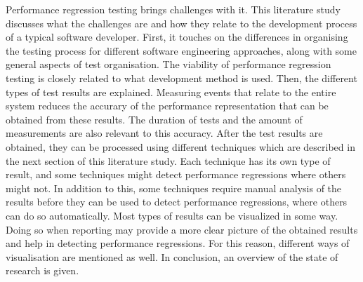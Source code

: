 Performance regression testing brings challenges with it. This literature study discusses what the challenges are and how they relate to the development process of a typical software developer.
First, it touches on the differences in organising the testing process for different software engineering approaches, along with some general aspects of test organisation. The viability of performance regression testing is closely related to what development method is used.
Then, the different types of test results are explained. Measuring events that relate to the entire system reduces the accurary of the performance representation that can be obtained from these results. The duration of tests and the amount of measurements are also relevant to this accuracy.
After the test results are obtained, they can be processed using different techniques which are described in the next section of this literature study. Each technique has its own type of result, and some techniques might detect performance regressions where others might not. In addition to this, some techniques require manual analysis of the results before they can be used to detect performance regressions, where others can do so automatically.
Most types of results can be visualized in some way. Doing so when reporting may provide a more clear picture of the obtained results and help in detecting performance regressions. For this reason, different ways of visualisation are mentioned as well. In conclusion, an overview of the state of research is given.
